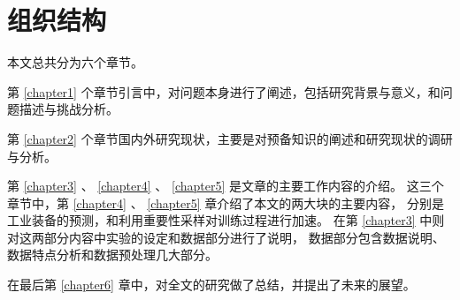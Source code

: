 \section{组织结构}
本文总共分为六个章节。

第 \ref{chapter1} 个章节引言中，对问题本身进行了阐述，包括研究背景与意义，和问题描述与挑战分析。

第 \ref{chapter2} 个章节国内外研究现状，主要是对预备知识的阐述和研究现状的调研与分析。

第 \ref{chapter3} 、 \ref{chapter4} 、 \ref{chapter5} 是文章的主要工作内容的介绍。
这三个章节中，第 \ref{chapter4} 、 \ref{chapter5} 章介绍了本文的两大块的主要内容，
分别是工业装备的预测，和利用重要性采样对训练过程进行加速。
在第 \ref{chapter3} 中则对这两部分内容中实验的设定和数据部分进行了说明，
数据部分包含数据说明、数据特点分析和数据预处理几大部分。

在最后第  \ref{chapter6} 章中，对全文的研究做了总结，并提出了未来的展望。